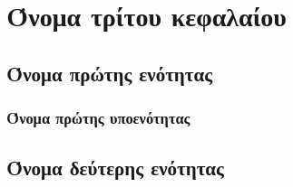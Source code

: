 
\chapter{Όνομα τρίτου κεφαλαίου}


\section{Όνομα πρώτης ενότητας}

\subsection{Όνομα πρώτης υποενότητας}


\section{Όνομα δεύτερης ενότητας}








\endinput
